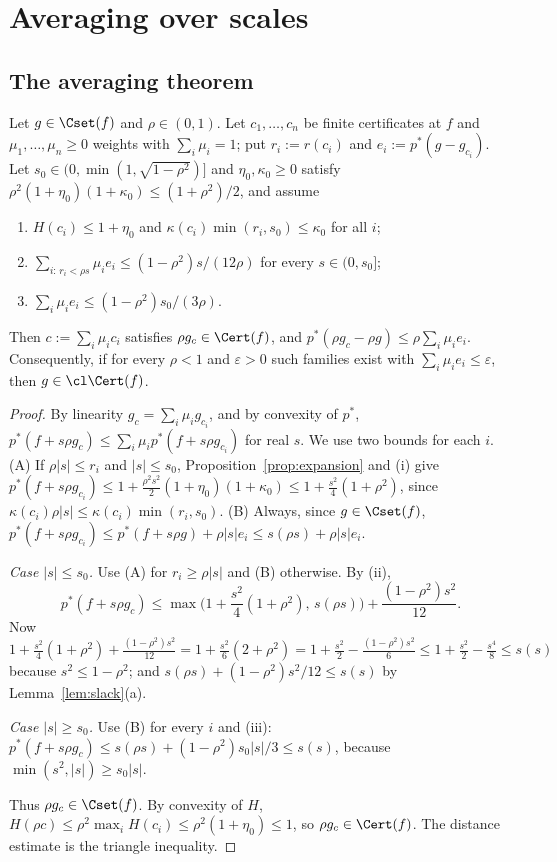 \section{Averaging over scales}\label{sec:averaging}

\subsection{The averaging theorem}

\begin{theorem}\label{thm:averaging}
Let $g\in\Cset(f)$ and $\rho\in(0,1)$.  Let $c_1,\dots,c_n$ be finite
certificates at $f$ and $\mu_1,\dots,\mu_n\ge0$ weights with
$\sum_i\mu_i=1$; put $r_i:=r(c_i)$ and $e_i:=p^*(g-g_{c_i})$.  Let
$s_0\in(0,\min(1,\sqrt{1-\rho^2})]$ and $\eta_0,\kappa_0\ge0$ satisfy
$\rho^2(1+\eta_0)(1+\kappa_0)\le(1+\rho^2)/2$, and assume
\begin{enumerate}
\item[(i)] $H(c_i)\le1+\eta_0$ and $\kappa(c_i)\min(r_i,s_0)\le\kappa_0$
for all $i$;
\item[(ii)] $\sum_{i:\,r_i<\rho s}\mu_ie_i\le(1-\rho^2)s/(12\rho)$ for every
$s\in(0,s_0]$;
\item[(iii)] $\sum_i\mu_ie_i\le(1-\rho^2)s_0/(3\rho)$.
\end{enumerate}
Then $c:=\sum_i\mu_ic_i$ satisfies $\rho g_c\in\Cert(f)$, and
$p^*(\rho g_c-\rho g)\le\rho\sum_i\mu_ie_i$.  Consequently, if for every
$\rho<1$ and $\varepsilon>0$ such families exist with
$\sum_i\mu_ie_i\le\varepsilon$, then $g\in\cl\Cert(f)$.
\end{theorem}

\begin{proof}
By linearity $g_c=\sum_i\mu_ig_{c_i}$, and by convexity of $p^*$,
$p^*(f+s\rho g_c)\le\sum_i\mu_ip^*(f+s\rho g_{c_i})$ for real $s$.  We
use two bounds for each $i$.  (A) If $\rho|s|\le r_i$ and $|s|\le s_0$,
Proposition~\ref{prop:expansion} and (i) give
$p^*(f+s\rho g_{c_i})\le1+\frac{\rho^2s^2}2(1+\eta_0)(1+\kappa_0)\le
1+\frac{s^2}4(1+\rho^2)$, since $\kappa(c_i)\rho|s|\le\kappa(c_i)
\min(r_i,s_0)$.  (B) Always, since $g\in\Cset(f)$,
$p^*(f+s\rho g_{c_i})\le p^*(f+s\rho g)+\rho|s|e_i\le s(\rho s)+\rho|s|e_i$.

\emph{Case $|s|\le s_0$.}  Use (A) for $r_i\ge\rho|s|$ and (B) otherwise.
By (ii),
\[
 p^*(f+s\rho g_c)\le\max\Big(1+\frac{s^2}4(1+\rho^2),\,s(\rho s)\Big)
 +\frac{(1-\rho^2)s^2}{12}.
\]
Now $1+\frac{s^2}4(1+\rho^2)+\frac{(1-\rho^2)s^2}{12}=1+\frac{s^2}{6}
(2+\rho^2)=1+\frac{s^2}2-\frac{(1-\rho^2)s^2}6\le1+\frac{s^2}2-\frac{s^4}8
\le s(s)$ because $s^2\le1-\rho^2$; and $s(\rho s)+(1-\rho^2)s^2/12\le s(s)$
by Lemma~\ref{lem:slack}(a).

\emph{Case $|s|\ge s_0$.}  Use (B) for every $i$ and (iii):
$p^*(f+s\rho g_c)\le s(\rho s)+(1-\rho^2)s_0|s|/3\le s(s)$, because
$\min(s^2,|s|)\ge s_0|s|$.

Thus $\rho g_c\in\Cset(f)$.  By convexity of $H$,
$H(\rho c)\le\rho^2\max_iH(c_i)\le\rho^2(1+\eta_0)\le1$, so $\rho
g_c\in\Cert(f)$.  The distance estimate is the triangle inequality.
\end{proof}

